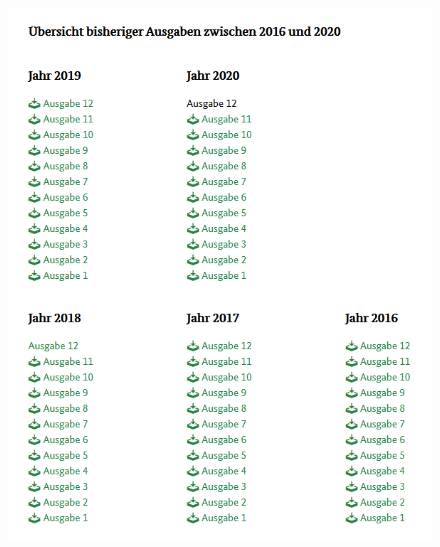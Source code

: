 \documentclass{beamer}
\begin{document}
\begin{frame}
\begin{figure}[!tbp]
\begin{minipage}[b]{0.4\textwidth}
    			\includegraphics[scale=0.4,width=\textwidth]{2_Monatsberichte}
  			\end{minipage}
		\end{figure}
\end{frame}
\end{document}
